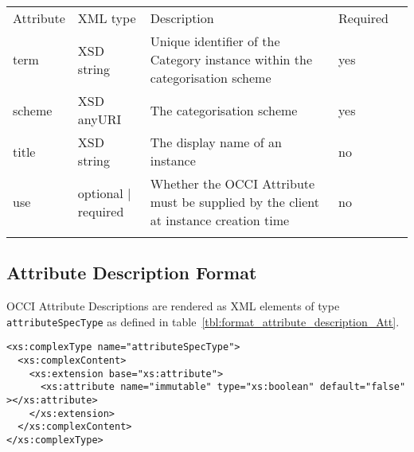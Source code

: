\documentclass[10pt,a4paper]{article}
\begin{document}
	{
    \begin{tabularx}{\textwidth}{llXll}
    \toprule
    Attribute & XML type & Description & Required \\
    \colrule
    term & XSD string & Unique identifier of the Category instance within the categorisation scheme & yes \\
    scheme & XSD anyURI & The categorisation scheme & yes \\
    title & XSD string & The display name of an instance & no \\
    use & optional | required & Whether the OCCI Attribute must be supplied by the client at instance creation time & no \\
    \botrule
    \end{tabularx}
}
\FloatBarrier

\subsection{Attribute Description Format}
\label{sec:format_attribute_description}

OCCI Attribute Descriptions are rendered as XML elements of type
\texttt{attributeSpecType} as defined in
table~\ref{tbl:format_attribute_description_Att}.

\begin{lstlisting}
<xs:complexType name="attributeSpecType">
  <xs:complexContent>
    <xs:extension base="xs:attribute">
      <xs:attribute name="immutable" type="xs:boolean" default="false" ></xs:attribute>
    </xs:extension>
  </xs:complexContent>
</xs:complexType>
\end{lstlisting}

\FloatBarrier
\end{document}
